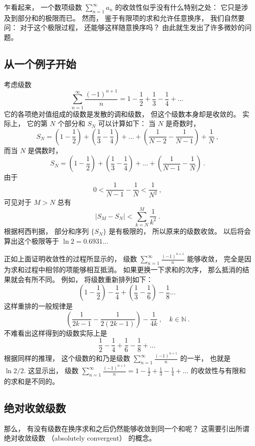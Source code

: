 

乍看起来， 一个数项级数 $\sum_{n=1}^\infty a_n$ 的收敛性似乎没有什么特别之处： 它只是涉及到部分和的极限而已。 然而， 鉴于有限项的求和允许任意换序， 我们自然要问： 对于这个极限过程， 还能够这样随意换序吗？ 由此就生发出了许多微妙的问题。

\subsection{从一个例子开始}

考虑级数
$$
\sum_{n=1}^\infty\frac{(-1)^{n+1}}{n}
=1-\frac{1}{2}+\frac{1}{3}-\frac{1}{4}+...~
$$
它的各项绝对值组成的级数是发散的调和级数， 但这个级数本身却是收敛的。 实际上， 它的第 $N$ 个部分和 $S_N$ 可以计算如下： 当 $N$ 是奇数时，
$$
S_N=\left(1-\frac{1}{2}\right)+\left(\frac{1}{3}-\frac{1}{4}\right)+...+\left(\frac{1}{N-2}-\frac{1}{N-1}\right)+\frac{1}{N}~,
$$
而当 $N$ 是偶数时，
$$
S_N=\left(1-\frac{1}{2}\right)+\left(\frac{1}{3}-\frac{1}{4}\right)+...+\left(\frac{1}{N-1}-\frac{1}{N}\right)~.
$$
由于
$$
0<\frac{1}{N-1}-\frac{1}{N}<\frac{1}{N^2}~,
$$
可见对于 $M>N$ 总有
$$
|S_M-S_N|<\sum_{k=N}^M\frac{1}{k^2}~.
$$
根据柯西判据， 部分和序列 $\{S_N\}$ 是有极限的， 所以原来的级数收敛。 以后将会算出这个极限等于 $\ln2=0.6931...$

正如上面证明收敛性的过程所显示的， 级数 $\sum_{n=1}^\infty\frac{(-1)^{n+1}}{n}$ 能够收敛， 完全是因为求和过程中相邻的项能够相互抵消。 如果更换一下求和的次序， 那么抵消的结果就会有所不同。 例如， 将级数重新排列如下：
$$
\left(1-\frac{1}{2}\right)-\frac{1}{4}+\left(\frac{1}{3}-\frac{1}{6}\right)-\frac{1}{8}...~
$$
这样重排的一般规律是
$$
\left(\frac{1}{2k-1}-\frac{1}{2(2k-1)}\right)-\frac{1}{4k}~,
\quad k\in\mathbb{N}~.
$$
不难看出这样得到的级数实际上是
$$
\frac{1}{2}-\frac{1}{4}+\frac{1}{6}-\frac{1}{8}+...~
$$
根据同样的推理， 这个级数的和乃是级数 $\sum_{n=1}^\infty\frac{(-1)^{n+1}}{n}$ 的一半， 也就是 $\ln2/2$. 这显示出， 级数 $\sum_{n=1}^\infty\frac{(-1)^{n+1}}{n}
=1-\frac{1}{2}+\frac{1}{3}-\frac{1}{4}+...$ 的收敛性与有限和的求和是不同的。

\subsection{绝对收敛级数}

那么， 有没有级数在换序求和之后仍然能够收敛到同一个和呢？ 这需要引出所谓绝对收敛级数 （absolutely convergent） 的概念。

